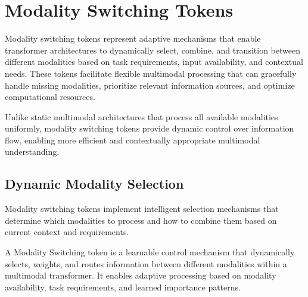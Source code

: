
\section{Modality Switching Tokens}

Modality switching tokens represent adaptive mechanisms that enable transformer architectures to dynamically select, combine, and transition between different modalities based on task requirements, input availability, and contextual needs. These tokens facilitate flexible multimodal processing that can gracefully handle missing modalities, prioritize relevant information sources, and optimize computational resources.

Unlike static multimodal architectures that process all available modalities uniformly, modality switching tokens provide dynamic control over information flow, enabling more efficient and contextually appropriate multimodal understanding.

\subsection{Dynamic Modality Selection}

Modality switching tokens implement intelligent selection mechanisms that determine which modalities to process and how to combine them based on current context and requirements.

\begin{definition}
A Modality Switching token is a learnable control mechanism that dynamically selects, weights, and routes information between different modalities within a multimodal transformer. It enables adaptive processing based on modality availability, task requirements, and learned importance patterns.
\end{definition}

